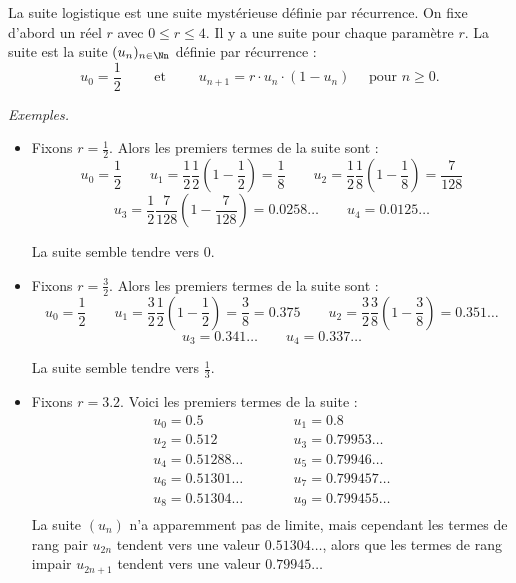 \documentclass[11pt,class=report,crop=false]{standalone}
\begin{document}




\begin{cours}

	
La suite logistique est une suite mystérieuse définie par récurrence.
On fixe d'abord un réel $r$ avec $0 \le r \le 4$. Il y a une suite pour chaque paramètre $r$.
La suite  est la suite $(u_n)_{n\in\Nn}$ définie par récurrence :
$$u_0 = \frac12 
\qquad \text{ et } \qquad
u_{n+1} = r \cdot u_n \cdot (1-u_n) \quad \text{ pour } n\ge0.$$

\emph{Exemples.}
\begin{itemize}
  \item Fixons $r=\frac12$.
  Alors les premiers termes de la suite sont :
  $$u_0 = \frac12 \qquad 
  u_1 = \frac12 \frac12 \left(1-\frac12\right) = \frac18 \qquad
  u_2 = \frac12 \frac18 \left(1-\frac18\right) = \frac 7{128}$$
  $$
  u_3 = \frac12 \frac 7{128} \left(1-\frac7{128}\right) = 0.0258\ldots \qquad 
  u_4 = 0.0125\ldots$$ 
  
  La suite semble tendre vers $0$.
  
  \item Fixons $r=\frac32$.
  Alors les premiers termes de la suite sont :
  $$u_0 = \frac12 \qquad 
  u_1 = \frac32 \frac12 \left(1-\frac12\right) = \frac38 = 0.375 \qquad
  u_2 = \frac32 \frac38 \left(1-\frac38\right) = 0.351\ldots$$
  $$
  u_3 = 0.341\ldots \qquad 
  u_4 = 0.337\ldots$$ 
  
  La suite semble tendre vers $\frac13$.
  
  \item Fixons $r=3.2$. Voici les premiers termes de la suite :
$$	\begin{array}{lcl}
u_0 = 0.5 &\qquad& u_1 = 0.8 \\
u_2 = 0.512 &\qquad& u_3 = 0.79953\ldots \\
u_4 = 0.51288\ldots &\qquad& u_5 = 0.79946\ldots \\
u_6 = 0.51301\ldots &\qquad& u_7 = 0.799457\ldots \\
u_8 = 0.51304\ldots &\qquad& u_9 = 0.799455\ldots \\		
	\end{array}$$  
La suite $(u_n)$ n'a apparemment pas de limite, mais cependant les termes de rang pair $u_{2n}$ tendent vers une valeur $0.51304\ldots$, alors que les termes de rang impair $u_{2n+1}$ tendent vers une valeur $0.79945\ldots$
\end{itemize}


\end{cours}
\end{document}
